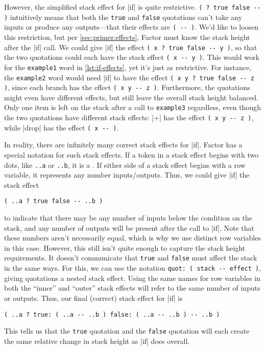 
However, the simplified stack effect for \factor|if| is quite restrictive.
%
\Verb|( ? true false -- )|
%
intuitively means that both the \Verb|true| and \Verb|false| quotations
can't take any inputs or produce any outputs---that their effects are
%
\Verb|( -- )|.
%
We'd like to loosen this restriction, but per \cref{sec:primer:effects}, Factor
must know the stack height after the \factor|if| call.  We could give
\factor|if| the effect
%
\Verb|( x ? true false -- y )|,
%
so that the two quotations could each have the stack effect
%
\Verb|( x -- y )|.
%
This would work for the \Verb|example1| word in \cref{lst:if-effects}, yet
it's just as restrictive.  For instance, the \Verb|example2| word would need
\factor|if| to have the effect
%
\Verb|( x y ? true false -- z )|,
%
since each branch has the effect
%
\Verb|( x y -- z )|.
%
Furthermore, the quotations might even have different effects, but still leave
the overall stack height balanced.  Only one item is left on the stack after a
call to \Verb|example3| regardless, even though the two quotations have
different stack effects: \factor|+| has the effect
%
\Verb|( x y -- z )|,
%
while \factor|drop| has the effect
%
\Verb|( x -- )|.

In reality, there are infinitely many correct stack effects for \factor|if|.
Factor has a special notation for such  stack effects.
If a token in a stack effect begins with two dots, like \Verb|..a| or
\Verb|..b|, it is a .  If either side of a stack effect
begins with a row variable, it represents any number inputs/outputs.  Thus, we
could give \factor|if| the stack effect
%
\begin{center} \Verb|( ..a ? true false -- ..b )| \end{center}
%
\noindent to indicate that there may be any number of inputs below the
condition on the stack, and any number of outputs will be present after the
call to \factor|if|.  Note that these numbers aren't necessarily equal, which
is why we use distinct row variables in this case.  However, this still isn't
quite enough to capture the stack height requirements.  It doesn't communicate
that \Verb|true| and \Verb|false| must affect the stack in the same ways.
For this, we can use the notation
%
\Verb|quot: ( stack -- effect )|,
%
giving quotations a nested stack effect.  Using the same names for row
variables in both the ``inner'' and ``outer'' stack effects will refer to the
same number of inputs or outputs.  Thus, our final (correct) stack effect for
\factor|if| is 
%
\begin{center}
%
  \Verb|( ..a ? true: ( ..a -- ..b ) false: ( ..a -- ..b ) -- ..b )|
%
\end{center}
%
\noindent This tells us that the \Verb|true| quotation and the \Verb|false|
quotation will each create the same relative change in stack height as
\factor|if| does overall.

